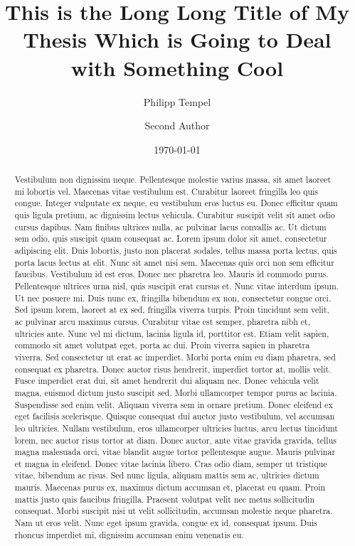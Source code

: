 \documentclass[%
  german,%
  exercise,%
  oneside,%
]{iswartcl}
\title{This is the Long Long Title of My Thesis Which is Going to Deal with Something Cool}
\author{Philipp Tempel \and Second Author}
\date{\today}
\begin{document}

\maketitle


\begin{abstract}
  Vestibulum non dignissim neque. Pellentesque molestie varius massa, sit amet laoreet mi lobortis vel. Maecenas vitae vestibulum est. Curabitur laoreet fringilla leo quis congue. Integer vulputate ex neque, eu vestibulum eros luctus eu. Donec efficitur quam quis ligula pretium, ac dignissim lectus vehicula. Curabitur suscipit velit sit amet odio cursus dapibus. Nam finibus ultrices nulla, ac pulvinar lacus convallis ac. Ut dictum sem odio, quis suscipit quam consequat ac. Lorem ipsum dolor sit amet, consectetur adipiscing elit.
  Duis lobortis, justo non placerat sodales, tellus massa porta lectus, quis porta lacus lectus at elit. Nunc sit amet nisi sem. Maecenas quis orci non sem efficitur faucibus. Vestibulum id est eros. Donec nec pharetra leo. Mauris id commodo purus. Pellentesque ultrices urna nisl, quis suscipit erat cursus et. Nunc vitae interdum ipsum. Ut nec posuere mi. Duis nunc ex, fringilla bibendum ex non, consectetur congue orci. Sed ipsum lorem, laoreet at ex sed, fringilla viverra turpis. Proin tincidunt sem velit, ac pulvinar arcu maximus cursus. Curabitur vitae est semper, pharetra nibh et, ultricies ante.
  Nunc vel mi dictum, lacinia ligula id, porttitor est. Etiam velit sapien, commodo sit amet volutpat eget, porta ac dui. Proin viverra sapien in pharetra viverra. Sed consectetur ut erat ac imperdiet. Morbi porta enim eu diam pharetra, sed consequat ex pharetra. Donec auctor risus hendrerit, imperdiet tortor at, mollis velit. Fusce imperdiet erat dui, sit amet hendrerit dui aliquam nec. Donec vehicula velit magna, euismod dictum justo suscipit sed. Morbi ullamcorper tempor purus ac lacinia. Suspendisse sed enim velit. Aliquam viverra sem in ornare pretium.
  Donec eleifend ex eget facilisis scelerisque. Quisque consequat dui auctor justo vestibulum, vel accumsan leo ultricies. Nullam vestibulum, eros ullamcorper ultricies luctus, arcu lectus tincidunt lorem, nec auctor risus tortor at diam. Donec auctor, ante vitae gravida gravida, tellus magna malesuada orci, vitae blandit augue tortor pellentesque augue. Mauris pulvinar et magna in eleifend. Donec vitae lacinia libero. Cras odio diam, semper ut tristique vitae, bibendum ac risus. Sed nunc ligula, aliquam mattis sem ac, ultricies dictum mauris. Maecenas purus ex, maximus dictum accumsan et, placerat eu quam. Proin mattis justo quis faucibus fringilla. Praesent volutpat velit nec metus sollicitudin consequat. Morbi suscipit nisi ut velit sollicitudin, accumsan molestie neque pharetra. Nam ut eros velit. Nunc eget ipsum gravida, congue ex id, consequat ipsum. Duis rhoncus imperdiet mi, dignissim accumsan enim venenatis eu.
  

\end{abstract}
\end{document}
